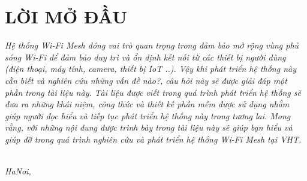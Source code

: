 \chapter*{LỜI MỞ ĐẦU}

\emph{ Hệ thống Wi-Fi Mesh đóng vai trò quan trọng trong đảm bảo mở rộng vùng phủ sóng Wi-Fi để đảm bảo duy trì và ổn định kết nối từ các thiết bị người dùng (điện thoại, máy tính, camera, thiết bị IoT ..). Vậy khi phát triển hệ thống này cần biết và nghiên cứu những vấn đề nào?, câu hỏi này sẽ được giải đáp một phần trong tài liệu này. Tài liệu được viết trong quá trình phát triển hệ thống sẽ đưa ra những khái niệm, công thức và thiết kế phần mềm được sử dụng nhằm giúp người đọc hiểu và tiếp tục phát triển hệ thống này trong tương lai. Mong rằng, với những nội dung được trình bày trong tài liệu này sẽ giúp bạn hiểu và giúp đỡ trong quá trình nghiên cứu và phát triển hệ thống Wi-Fi Mesh tại VHT.}

\begin{flushright}
{\makeatletter\itshape
    \@author \\
    HaNoi, \monthname{} \the\year{}
\makeatother}
\end{flushright}
